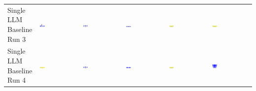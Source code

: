 \begin{table}
\begin{tabularx}{\textwidth}{@{}XXXXXX@{}}
    \makecell{Single LLM \\ Baseline \\ Run 3} & \includegraphics[width=0.13\textwidth]{./run_3/png/gpt-4o_results/DLDChip.png} & \includegraphics[width=0.13\textwidth]{./run_3/png/o1-preview_results/DLDChip.png} & \includegraphics[width=0.13\textwidth]{./run_3/png/claude-3-5-sonnet-20240620_results/DLDChip.png} & \includegraphics[width=0.13\textwidth]{./run_3/png/watsonx_meta-llama_llama-3-1-70b-instruct_results/DLDChip.png} & \includegraphics[width=0.13\textwidth]{./run_3/png/watsonx_meta-llama_llama-3-405b-instruct_results/DLDChip.png} \\
    \makecell{Single LLM \\ Baseline \\ Run 4} & \includegraphics[width=0.13\textwidth]{./run_4/png/gpt-4o_results/DLDChip.png} & \includegraphics[width=0.13\textwidth]{./run_4/png/o1-preview_results/DLDChip.png} & \includegraphics[width=0.13\textwidth]{./run_4/png/claude-3-5-sonnet-20240620_results/DLDChip.png} & \includegraphics[width=0.13\textwidth]{./run_4/png/watsonx_meta-llama_llama-3-1-70b-instruct_results/DLDChip.png} & \includegraphics[width=0.13\textwidth]{./run_4/png/watsonx_meta-llama_llama-3-405b-instruct_results/DLDChip.png} \\

\end{tabularx}
\end{table}
